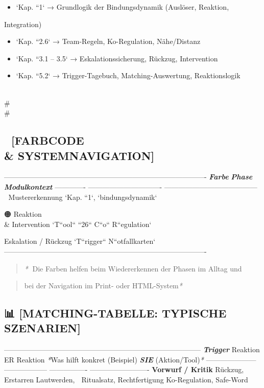 \begin{itemize}
\item   `Kap. ``1` → Grundlogik der Bindungsdynamik (Auslöser, Reaktion,
\end{itemize}
Integration)
\begin{itemize}
\item   `Kap. ``2.6` → Team-Regeln, Ko-Regulation, Nähe/Distanz
\item   `Kap. ``3.1 -- 3.5` → Eskalationssicherung, Rückzug, Intervention
\item   `Kap. ``5.2` → Trigger-Tagebuch, Matching-Auswertung, Reaktionslogik
\end{itemize}

\\#\\#

\subsection{🎨 \textbf{[FARBCODE \\& SYSTEMNAVIGATION]}}

-------------------------------------------------------------------------------------
\textbf{\textit{Farbe}}   \textbf{\textit{Phase}}                     \textbf{\textit{Modulkontext}}
------------- ------------------------------- ---------------------------------------
🔵            Mustererkennung                 `Kap. ``1`, `bindungsdynamik`

🟠            Reaktion \\& Intervention         `T``ool`` ``26`` C``o`` R``egulation`

\textcolor{ctmmRed}{\faCircle}            Eskalation / Rückzug            `T``rigger`` N``otfallkarten`
-------------------------------------------------------------------------------------

\begin{quote}
\textit{*}📎 Die Farben helfen beim Wiedererkennen der Phasen im Alltag und
\end{quote}
\begin{quote}
bei der Navigation im Print- oder HTML-System\textit{*}
\end{quote}

\subsection{📊 \textbf{[MATCHING-TABELLE: TYPISCHE SZENARIEN]}}

-----------------------------------------------------------------------------------
\textbf{\textit{\textcolor{ctmmRed}{Trigger}            }}Reaktion ER\textbf{\textit{  }}Reaktion      \textit{*}Was hilft konkret
(Beispiel)\textbf{\textit{                            SIE}}           (Aktion/Tool)\textit{*}
--------------------- ------------------ ---------------- -------------------------
\textbf{Vorwurf / Kritik}  Rückzug, Erstarren Lautwerden,      🔁 Ritualsatz,
Rechtfertigung   Ko-Regulation, Safe-Word

